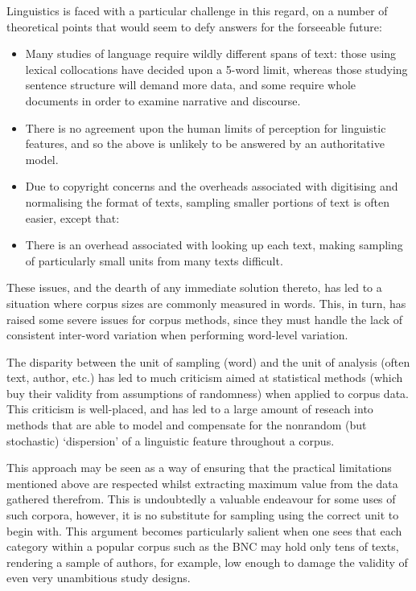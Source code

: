 Linguistics is faced with a particular challenge in this regard, on a number of theoretical points that would seem to defy answers for the forseeable future:

\begin{itemize}
    \item Many studies of language require wildly different spans of text: those using lexical collocations have decided upon a 5-word limit, whereas those studying sentence structure will demand more data, and some require whole documents in order to examine narrative and discourse.
    \item There is no agreement upon the human limits of perception for linguistic features, and so the above is unlikely to be answered by an authoritative model.
    \item Due to copyright concerns and the overheads associated with digitising and normalising the format of texts, sampling smaller portions of text is often easier, except that:
    \item There is an overhead associated with looking up each text, making sampling of particularly small units from many texts difficult.
\end{itemize}


These issues, and the dearth of any immediate solution thereto, has led to a situation where corpus sizes are commonly measured in words.  This, in turn, has raised some severe issues for corpus methods, since they must handle the lack of consistent inter-word variation when performing word-level variation.

The disparity between the unit of sampling (word) and the unit of analysis (often text, author, etc.) has led to much criticism aimed at statistical methods (which buy their validity from assumptions of randomness) when applied to corpus data.  This criticism is well-placed, and has led to a large amount of reseach into methods that are able to model and compensate for the nonrandom (but stochastic) `dispersion' of a linguistic feature throughout a corpus.

This approach may be seen as a way of ensuring that the practical limitations mentioned above are respected whilst extracting maximum value from the data gathered therefrom.  This is undoubtedly a valuable endeavour for some uses of such corpora, however, it is no substitute for sampling using the correct unit to begin with.  This argument becomes particularly salient when one sees that each category within a popular corpus such as the BNC may hold only tens of texts, rendering a sample of authors, for example, low enough to damage the validity of even very unambitious study designs.

